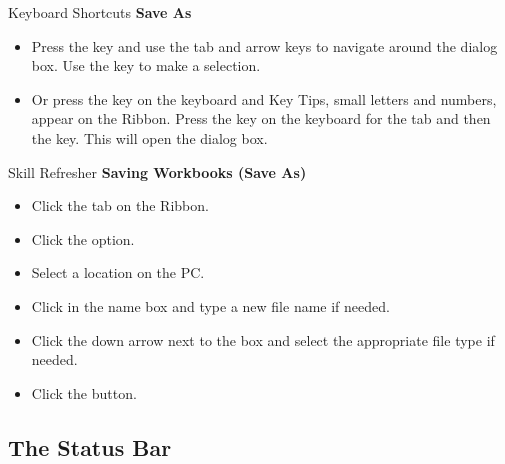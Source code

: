 \begin{center}
	\begin{shtcutbox}{Keyboard Shortcuts}
		\textbf{Save As}
		\\
		\begin{itemize}
			\setlength{\itemsep}{0pt}
			\setlength{\parskip}{0pt}
			\setlength{\parsep}{0pt}
			
			\item Press the  key and use the tab and arrow keys to navigate around the  dialog box. Use the  key to make a selection.
			\item Or press the  key on the keyboard and Key Tips, small letters and numbers, appear on the Ribbon. Press the  key on the keyboard for the  tab and then the  key. This will open the  dialog box.
			
		\end{itemize}
	\end{shtcutbox}
\end{center}

\begin{center}
	\begin{sklbox}{Skill Refresher}
		\textbf{Saving Workbooks (Save As)}
		\\
		\begin{itemize}
			\setlength{\itemsep}{0pt}
			\setlength{\parskip}{0pt}
			\setlength{\parsep}{0pt}
			
			\item Click the  tab on the Ribbon.
			\item Click the  option.
			\item Select a location on the PC.
			\item Click in the  name box and type a new file name if needed.
			\item Click the down arrow next to the  box and select the appropriate file type if needed.
			\item Click the  button.
		
		\end{itemize}
	\end{sklbox}
\end{center}

\subsection{The Status Bar}

